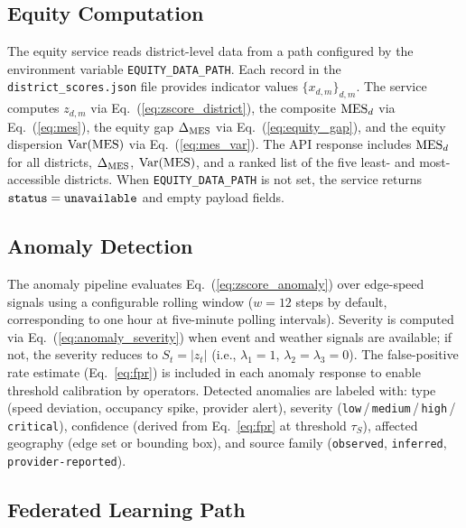 \subsection{Equity Computation}

The equity service reads district-level data from a path configured by
the environment variable \texttt{EQUITY\_DATA\_PATH}.
Each record in the \texttt{district\_scores.json} file provides indicator
values $\{x_{d,m}\}_{d,m}$.
The service computes $z_{d,m}$ via Eq.~(\ref{eq:zscore_district}),
the composite $\mathrm{MES}_d$ via Eq.~(\ref{eq:mes}), the equity gap
$\Delta_{\mathrm{MES}}$ via Eq.~(\ref{eq:equity_gap}), and the equity dispersion
$\mathrm{Var}(\mathrm{MES})$ via Eq.~(\ref{eq:mes_var}).
The API response includes $\mathrm{MES}_d$ for all districts, $\Delta_{\mathrm{MES}}$,
$\mathrm{Var}(\mathrm{MES})$, and a ranked list of the five least- and
most-accessible districts.
When \texttt{EQUITY\_DATA\_PATH} is not set, the service returns
$\mathtt{status} = \texttt{unavailable}$ and empty payload fields.

\subsection{Anomaly Detection}

The anomaly pipeline evaluates Eq.~(\ref{eq:zscore_anomaly}) over edge-speed
signals using a configurable rolling window ($w = 12$ steps by default,
corresponding to one hour at five-minute polling intervals).
Severity is computed via Eq.~(\ref{eq:anomaly_severity}) when event and
weather signals are available; if not, the severity reduces to
$S_t = |z_t|$ (i.e., $\lambda_1 = 1$, $\lambda_2 = \lambda_3 = 0$).
The false-positive rate estimate (Eq.~\ref{eq:fpr}) is included in each
anomaly response to enable threshold calibration by operators.
Detected anomalies are labeled with: type (speed deviation, occupancy
spike, provider alert), severity
(\texttt{low}\,/\,\texttt{medium}\,/\,\texttt{high}\,/\,\texttt{critical}),
confidence (derived from Eq.~\ref{eq:fpr} at threshold $\tau_S$),
affected geography (edge set or bounding box), and source family
(\texttt{observed}, \texttt{inferred}, \texttt{provider-reported}).

\subsection{Federated Learning Path}

